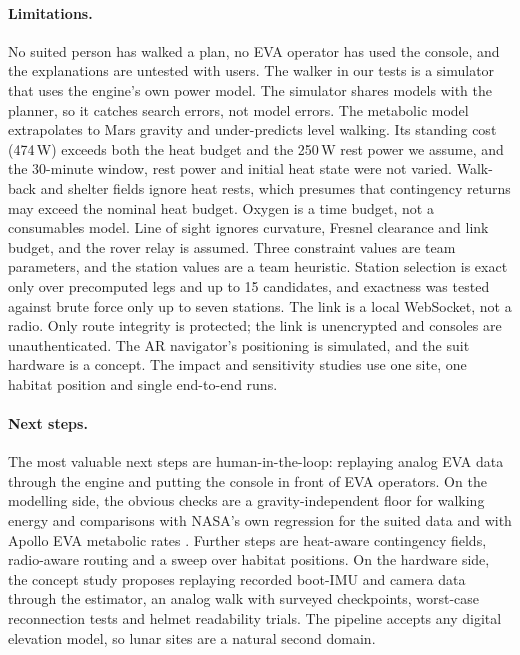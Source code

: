 \paragraph{Limitations.} No suited person has walked a \Marswalk plan, no EVA operator has used the console, and the explanations are untested with users. The walker in our tests is a simulator that uses the engine's own power model. The simulator shares models with the planner, so it catches search errors, not model errors. The metabolic model extrapolates to Mars gravity and under-predicts level walking. Its standing cost (474\,W) exceeds both the heat budget and the 250\,W rest power we assume, and the 30-minute window, rest power and initial heat state were not varied. Walk-back and shelter fields ignore heat rests, which presumes that contingency returns may exceed the nominal heat budget. Oxygen is a time budget, not a consumables model. Line of sight ignores curvature, Fresnel clearance and link budget, and the rover relay is assumed. Three constraint values are team parameters, and the station values are a team heuristic. Station selection is exact only over precomputed legs and up to 15 candidates, and exactness was tested against brute force only up to seven stations. The link is a local WebSocket, not a radio. Only route integrity is protected; the link is unencrypted and consoles are unauthenticated. The AR navigator's positioning is simulated, and the suit hardware is a concept. The impact and sensitivity studies use one site, one habitat position and single end-to-end runs.

\paragraph{Next steps.} The most valuable next steps are human-in-the-loop: replaying analog EVA data through the engine and putting the console in front of EVA operators. On the modelling side, the obvious checks are a gravity-independent floor for walking energy and comparisons with NASA's own regression for the suited data and with Apollo EVA metabolic rates \citep{waligora1975}. Further steps are heat-aware contingency fields, radio-aware routing and a sweep over habitat positions. On the hardware side, the concept study proposes replaying recorded boot-IMU and camera data through the estimator, an analog walk with surveyed checkpoints, worst-case reconnection tests and helmet readability trials. The pipeline accepts any digital elevation model, so lunar sites are a natural second domain.

